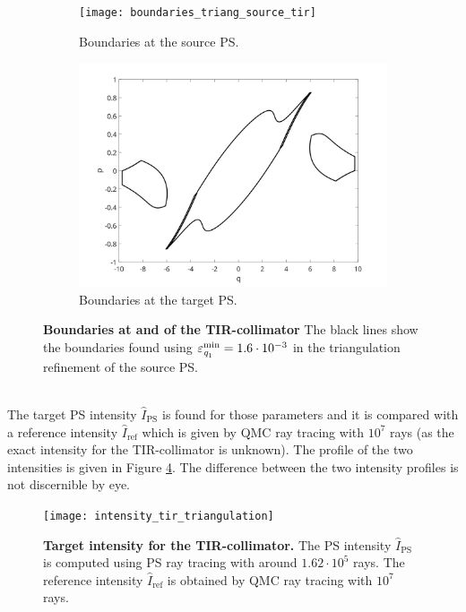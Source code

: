 \begin{figure}[h]
 \begin{subfigure}[t]{0.47\textwidth}
\centering
    \texttt{[image: boundaries\_triang\_source\_tir]}
    \caption{Boundaries at the source PS.}
    \label{fig:boundaries_triang_source_tir}
\end{subfigure}
\hfill
\begin{subfigure}[t]{0.47\textwidth}
\centering
    \includegraphics[width = \textwidth]{boundaries_triang_target_tir}
    \caption{Boundaries at the target PS.}
    \label{fig:boundaries_triang_target_tir}
\end{subfigure}
\caption{\textbf{Boundaries at  and  of the TIR-collimator} The black lines show the boundaries found using $\varepsilon_{\textit{q}_1}^{\textrm{min}}=1.6\cdot 10^{-3}$ in the triangulation refinement of the source PS.}
 \label{fig:boundaries_TIR_triangulation}
\end{figure}
 \\ \indent 
The target PS intensity $\hat{I}_{\textrm{PS}}$ is found for those parameters and it is compared with a reference intensity $\hat{I}_{\textrm{ref}}$ which is given by QMC ray tracing with $10^7$ rays (as the exact intensity for the TIR-collimator is unknown). The profile of the two intensities is given in Figure \ref{fig:intensity_tir_triangulation}. 
The difference between the two intensity profiles is not discernible by eye.
 \begin{figure}[ht]
  \center
  \texttt{[image: intensity\_tir\_triangulation]}
  \caption{\textbf{Target intensity for the TIR-collimator.} The PS intensity $\hat{I}_{\textrm{PS}}$ is computed using PS ray tracing with around $1.62\cdot 10^5$ rays. The reference intensity $\hat{I}_{\textrm{ref}}$ is obtained by QMC ray tracing with $10^7$ rays.}
  \label{fig:intensity_tir_triangulation}
\end{figure}
